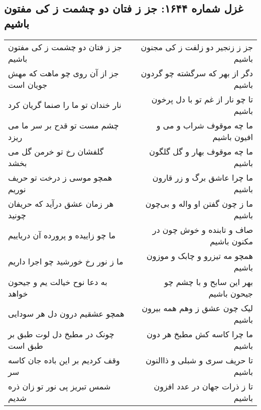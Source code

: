 \begin{center}
\section*{غزل شماره ۱۶۴۴: جز ز فتان دو چشمت ز کی مفتون باشیم}
\label{sec:1644}
\begin{longtable}{l p{0.5cm} r}
جز ز فتان دو چشمت ز کی مفتون باشیم
&&
جز ز زنجیر دو زلفت ز کی مجنون باشیم
\\
جز از آن روی چو ماهت که مهش جویان است
&&
دگر از بهر که سرگشته چو گردون باشیم
\\
نار خندان تو ما را صنما گریان کرد
&&
تا چو نار از غم تو با دل پرخون باشیم
\\
چشم مست تو قدح بر سر ما می ریزد
&&
ما چه موقوف شراب و می و افیون باشیم
\\
گلفشان رخ تو خرمن گل می بخشد
&&
ما چه موقوف بهار و گل گلگون باشیم
\\
همچو موسی ز درخت تو حریف نوریم
&&
ما چرا عاشق برگ و زر قارون باشیم
\\
هر زمان عشق درآید که حریفان چونید
&&
ما ز چون گفتن او واله و بی‌چون باشیم
\\
ما چو زاییده و پرورده آن دریاییم
&&
صاف و تابنده و خوش چون در مکنون باشیم
\\
ما ز نور رخ خورشید چو اجرا داریم
&&
همچو مه تیزرو و چابک و موزون باشیم
\\
به دعا نوح خیالت یم و جیحون خواهد
&&
بهر این سابح و با چشم چو جیحون باشیم
\\
همچو عشقیم درون دل هر سودایی
&&
لیک چون عشق ز وهم همه بیرون باشیم
\\
چونک در مطبخ دل لوت طبق بر طبق است
&&
ما چرا کاسه کش مطبخ هر دون باشیم
\\
وقف کردیم بر این باده جان کاسه سر
&&
تا حریف سری و شبلی و ذاالنون باشیم
\\
شمس تبریز پی نور تو زان ذره شدیم
&&
تا ز ذرات جهان در عدد افزون باشیم
\\
\end{longtable}
\end{center}
